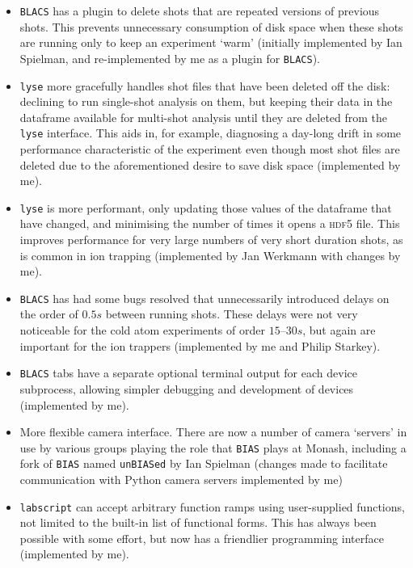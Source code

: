 \begin{itemize}
    \item \texttt{BLACS} has a plugin to delete shots that are repeated versions of previous shots. This prevents unnecessary consumption of disk space when these shots are running only to keep an experiment `warm' (initially implemented by Ian Spielman, and re-implemented by me as a plugin for \texttt{BLACS}).
    
    \item \texttt{lyse} more gracefully handles shot files that have been deleted off the disk: declining to run single-shot analysis on them, but keeping their data in the dataframe available for multi-shot analysis until they are deleted from the \texttt{lyse} interface. This aids in, for example, diagnosing a day-long drift in some performance characteristic of the experiment even though most shot files are deleted due to the aforementioned desire to save disk space (implemented by me).
    
    \item \texttt{lyse} is more performant, only updating those values of the dataframe that have changed, and minimising the number of times it opens a \textsc{hdf5} file. This improves performance for very large numbers of very short duration shots, as is common in ion trapping (implemented by Jan Werkmann with changes by me).
    
    \item \texttt{BLACS} has had some bugs resolved that unnecessarily introduced delays on the order of $0.5\unit{s}$ between running shots. These delays were not very noticeable for the cold atom experiments of order $15\textrm{--}30\unit{s}$, but again are important for the ion trappers (implemented by me and Philip Starkey).
    
    \item \texttt{BLACS} tabs have a separate optional terminal output for each device subprocess, allowing simpler debugging and development of devices (implemented by me).
    
    \item More flexible camera interface. There are now a number of camera `servers' in use by various groups playing the role that \texttt{BIAS} plays at Monash, including a fork of \texttt{BIAS} named \texttt{unBIASed} by Ian Spielman (changes made to facilitate communication with Python camera servers implemented by me)
    
    \item \texttt{labscript} can accept arbitrary function ramps using user-supplied functions, not limited to the built-in list of functional forms. This has always been possible with some effort, but now has a friendlier programming interface (implemented by me).
    

\end{itemize}
